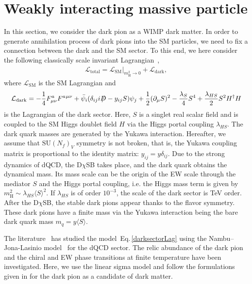 \documentclass[a4paper,preprint,superscriptaddress,preprintnumbers,nofootinbib]{revtex4}
\newcommand{\Slash}[1]{{\ooalign{\hfil/\hfil\crcr$#1$}}}
\newcommand{\al}[1]{\begin{align}#1\end{align}}
\newcommand{\p}{\partial}
\newcommand{\fn}[1]{\!\left(#1\right)}
\newcommand{\bra}{\langle}
\newcommand{\ket}{\rangle}
\newcommand{\Lag}{\mathcal L}
\begin{document}
\section{Weakly interacting massive particle}\label{wimpsection}
In this section, we consider the dark pion as a WIMP dark matter.
In order to generate annihilation process of dark pions into the SM particles, we need to fix a connection between the dark and the SM sector.
To this end, we here consider the following classically scale invariant Lagrangian~\cite{Hur:2007uz,Hur:2011sv},
\al{
\Lag_\text{total}=\Lag_\text{SM}|_{m_\text{H}^2\to 0}+\Lag_\text{dark},
}
where $\Lag_\text{SM}$ is the SM Lagrangian and
\al{
\Lag_\text{dark}=-\frac{1}{4}F_{\mu\nu}^aF^a{}^{\mu\nu} + \bar \psi_i (\delta _{ij}i\Slash D - y_{ij}S) \psi_j
+\frac{1}{2}(\p_\mu S)^2 -\frac{\lambda_S}{4}S^4 +\frac{\lambda_{HS}}{2}S^2H^\dagger H
\label{darksectorLag}
}
is the Lagrangian of the dark sector.
Here, $S$ is a singlet real scalar field and is coupled to the SM Higgs doublet field $H$ via the Higgs portal coupling $\lambda_{HS}$.
The dark quark masses are generated by the Yukawa interaction.
Hereafter, we assume that $\text{SU}\fn{N_f}_V$ symmetry is not broken, that is, the Yukawa coupling matrix is proportional to the identity matrix: $y_{ij}=y\delta_{ij}$.
Due to the strong dynamics of dQCD, the D$\chi$SB takes place, and the dark quark obtains the dynamical mass.
Its mass scale can be the origin of the EW scale through the mediator $S$ and the Higgs portal coupling, i.e. the Higgs mass term is given by $m_\text{H}^2 \sim \lambda_{HS}\bra S\ket^2$.
If $\lambda_{HS}$ is of order $10^{-3}$, the scale of the dark sector is TeV order.
After the D$\chi$SB, the stable dark pions appear thanks to the flavor symmetry.
These dark pions have a finite mass via the Yukawa interaction being the bare dark quark mass $m_q=y\bra S\ket$.

The literature~\cite{Holthausen:2013ota} has studied the model~Eq.\,\eqref{darksectorLag} using the Nambu--Jona-Lasinio model~\cite{Nambu:1961tp,Nambu:1961fr,Hatsuda:1994pi} for the dQCD sector. 
The relic abundance of the dark pion and the chiral and EW phase transitions at finite temperature have been investigated.
Here, we use the linear sigma model and follow the formulations given in \cite{Holthausen:2013ota} for the dark pion as a candidate of dark matter.
\end{document}
